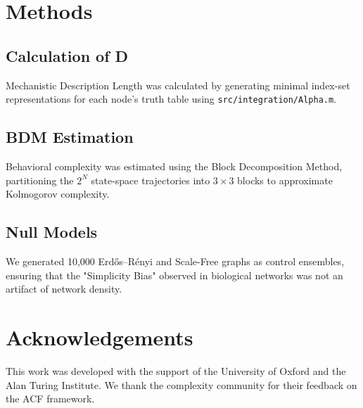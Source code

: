 \documentclass[10pt,twocolumn]{article}
\begin{document}
\section{Methods}
\subsection{Calculation of D}
Mechanistic Description Length was calculated by generating minimal index-set representations for each node's truth table using \texttt{src/integration/Alpha.m}. 

\subsection{BDM Estimation}
Behavioral complexity was estimated using the Block Decomposition Method, partitioning the $2^N$ state-space trajectories into $3 \times 3$ blocks to approximate Kolmogorov complexity.

\subsection{Null Models}
We generated 10,000 Erdős–Rényi and Scale-Free graphs as control ensembles, ensuring that the "Simplicity Bias" observed in biological networks was not an artifact of network density.

\section*{Acknowledgements}
This work was developed with the support of the University of Oxford and the Alan Turing Institute. We thank the complexity community for their feedback on the ACF framework.
\end{document}
